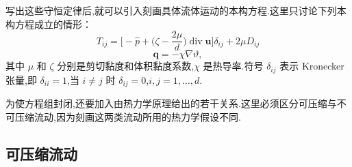 写出这些守恒定律后,就可以引入刻画具体流体运动的本构方程.这里只讨论下列本构方程成立的情形：
\begin{equation}\label{eq:13.1.6}
  T_{ij}=\biggl[-\widehat p+\biggl(\zeta-\frac{2\mu}{d}\biggr)
     \operatorname{div}\boldsymbol{u}\biggr]\delta_{ij}+2\mu D_{ij}
\end{equation}
\begin{equation}\label{eq:13.1.7}
  \boldsymbol{q}=-\chi\nabla\vartheta,
\end{equation}
其中 \(\mu\) 和 \(\zeta\) 分别是剪切黏度和体积黏度系数,\(\chi\) 是热导率.符号 \(\delta_{ij}\) 表示 Kronecker 张量,即 \(\delta_{ii}=1\),当 \(i\ne j\) 时 \(\delta_{ij}=0\),\(i,j=1,\ldots,d\).

为使方程组封闭,还要加入由热力学原理给出的若干关系.这里必须区分可压缩与不可压缩流动,因为刻画这两类流动所用的热力学假设不同.

\subsection{可压缩流动}\label{sec:13.1.1}

